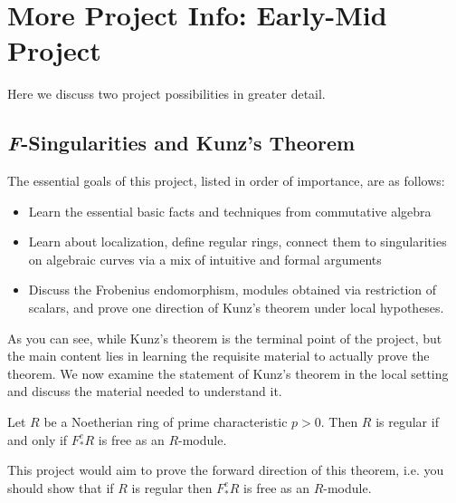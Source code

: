 \section{More Project Info: Early-Mid Project}
Here we discuss two project possibilities in greater detail.

\subsection{\textit{F}-Singularities and Kunz's Theorem}
The essential goals of this project, listed in order of importance, are as follows:
\begin{itemize}
	\item Learn the essential basic facts and techniques from commutative algebra
	\item Learn about localization, define regular rings, connect them to singularities on algebraic curves via a mix of intuitive and formal arguments
	\item Discuss the Frobenius endomorphism, modules obtained via restriction of scalars, and prove one direction of Kunz's theorem under local hypotheses.
\end{itemize}
As you can see, while Kunz's theorem is the terminal point of the project, but the main content lies in learning the requisite material to actually prove the theorem. We now examine the statement of Kunz's theorem in the local setting and discuss the material needed to understand it.
\begin{thm}\label{thm:kunz-theorem}
	Let $R$ be a Noetherian ring of prime characteristic $p > 0$. Then $R$ is regular if and only if $F^e_*R$ is free as an $R$-module.
\end{thm}
This project would aim to prove the forward direction of this theorem, i.e. you should show that if $R$ is regular then $F^e_*R$ is free as an $R$-module.

